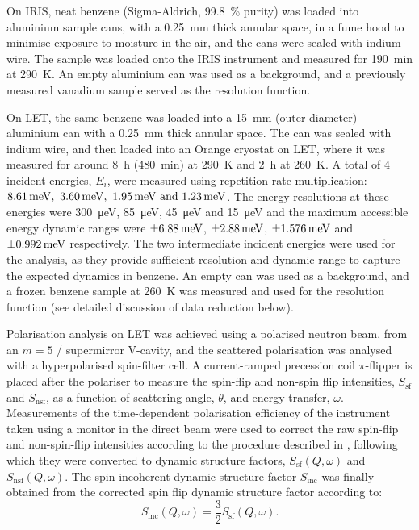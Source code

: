 \documentclass[reprint,
               superscriptaddress,
               nobibnotes,
               amsmath,
               amssymb,
               aps,
               hidelinks, 
               pre]{revtex4-2}
\begin{document}
On IRIS, neat benzene (Sigma-Aldrich, \qty{99.8}{\percent} purity) was loaded into aluminium sample cans, with a \qty{0.25}{\milli\meter} thick annular space, in a fume hood to minimise exposure to moisture in the air, and the cans were sealed with indium wire.
The sample was loaded onto the IRIS instrument and measured for \qty{190}{\minute} at \qty{290}{\kelvin}. 
An empty aluminium can was used as a background, and a previously measured vanadium sample served as the resolution function.

On LET, the same benzene was loaded into a \qty{15}{\milli\meter} (outer diameter) aluminium can with a \qty{0.25}{\milli\meter} thick annular space. 
The can was sealed with indium wire, and then loaded into an Orange cryostat on LET, where it was measured for around \qty{8}{\hour} (\qty{480}{\minute}) at \qty{290}{\kelvin} and \qty{2}{\hour} at \qty{260}{\kelvin}. 
A total of 4 incident energies, $E_i$, were measured using repetition rate multiplication: $\qtylist{8.61;3.60;1.95;1.23}{\milli\electronvolt}$. 
The energy resolutions at these energies were \qty{300}{\micro\electronvolt}, \qty{85}{\micro\electronvolt}, \qty{45}{\micro\electronvolt} and \qty{15}{\micro\electronvolt} and the maximum accessible energy dynamic ranges were $\qty{\pm6.88}{\milli\electronvolt}$, $\qty{\pm2.88}{\milli\electronvolt}$, $\qty{\pm1.576}{\milli\electronvolt}$ and $\qty{\pm0.992}{\milli\electronvolt}$ respectively.
The two intermediate incident energies were used for the analysis, as they provide sufficient resolution and dynamic range to capture the expected dynamics in benzene.
An empty can was used as a background, and a frozen benzene sample at \qty{260}{\kelvin} was measured and used for the resolution function (see detailed discussion of data reduction below).

Polarisation analysis on LET was achieved using a polarised neutron beam, from an $m=5$ / supermirror V-cavity, and the scattered polarisation was analysed with a hyperpolarised  spin-filter cell. 
A current-ramped precession coil $\pi$-flipper is placed after the polariser to measure the spin-flip and non-spin flip intensities, $S_{\mathrm{sf}}$ and $S_{\mathrm{nsf}}$, as a function of scattering angle, $\theta$, and energy transfer, $\omega$.
Measurements of the time-dependent polarisation efficiency of the instrument taken using a monitor in the direct beam were used to correct the raw spin-flip and non-spin-flip intensities according to the procedure described in \cite{Arbe2020, Cassella2019}, following which they were converted to dynamic structure factors, $S_{\mathrm{sf}}(Q, \omega)$ and $S_{\mathrm{nsf}}(Q, \omega)$. 
The spin-incoherent dynamic structure factor $S_{\mathrm{inc}}$ was finally obtained from the corrected spin flip dynamic structure factor according to:
%
\begin{equation}
    S_{\mathrm{inc}}(Q, \omega) = \frac{3}{2}S_{\mathrm{sf}}(Q, \omega).
\end{equation}
\end{document}
